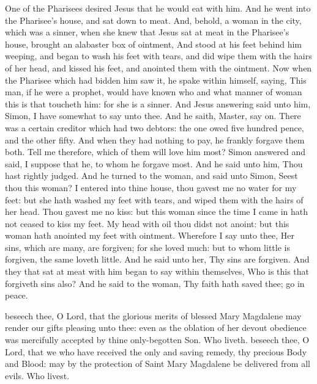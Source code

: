  One of the Pharisees desired Jesus that he would eat with him. And he went into the Pharisee's house, and sat down to meat. And, behold, a woman in the city, which was a sinner, when she knew that Jesus sat at meat in the Pharisee's house, brought an alabaster box of ointment, And stood at his feet behind him weeping, and began to wash his feet with tears, and did wipe them with the hairs of her head, and kissed his feet, and anointed them with the ointment. Now when the Pharisee which had bidden him saw it, he spake within himself, saying, This man, if he were a prophet, would have known who and what manner of woman this is that toucheth him: for she is a sinner. And Jesus answering said unto him, Simon, I have somewhat to say unto thee. And he saith, Master, say on. There was a certain creditor which had two debtors: the one owed five hundred pence, and the other fifty. And when they had nothing to pay, he frankly forgave them both. Tell me therefore, which of them will love him most? Simon answered and said, I suppose that he, to whom he forgave most. And he said unto him, Thou hast rightly judged. And he turned to the woman, and said unto Simon, Seest thou this woman? I entered into thine house, thou gavest me no water for my feet: but she hath washed my feet with tears, and wiped them with the hairs of her head. Thou gavest me no kiss: but this woman since the time I came in hath not ceased to kiss my feet. My head with oil thou didst not anoint: but this woman hath anointed my feet with ointment. Wherefore I say unto thee, Her sins, which are many, are forgiven; for she loved much: but to whom little is forgiven, the same loveth little. And he said unto her, Thy sins are forgiven. And they that sat at meat with him began to say within themselves, Who is this that forgiveth sins also? And he said to the woman, Thy faith hath saved thee; go in peace.

\clearpage
{}

\secret
{} beseech thee, O Lord, that the glorious merits of blessed Mary Magdalene may render our gifts pleasing unto thee: even as the oblation of her devout obedience was mercifully accepted by thine only-begotten Son. Who liveth.
\postcommunion
{} beseech thee, O Lord, that we who have received the only and saving remedy, thy precious Body and Blood: may by the protection of Saint Mary Magdalene be delivered from all evils. Who livest.


